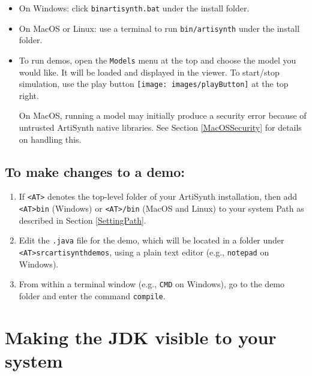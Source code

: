 \documentclass{article}
\begin{document}
\begin{itemize}[leftmargin=26pt]
 
\item On Windows: click {\tt bin\BKS artisynth.bat} under the install folder. 
 
\item On MacOS or Linux: use a terminal to run {\tt bin/artisynth} 
under the install folder.

\item[\ ] To run demos, open the {\tt Models} menu at the top and
choose the model you would like. It will be loaded and displayed in
the viewer. To start/stop simulation, use the play button
\texttt{[image: images/playButton]} at the top right.

\begin{sideblock}
On MacOS, running a model may initially produce a security error because of
untrusted ArtiSynth native libraries.  See Section \ref{MacOSSecurity} for
details on handling this.
\end{sideblock}

\end{itemize}

\subsection{To make changes to a demo:}

\begin{enumerate}

\item If {\tt <AT>} denotes the top-level folder of your ArtiSynth
installation, then add {\tt <AT>\BKS bin} (Windows) or {\tt <AT>/bin} (MacOS
and Linux) to your system Path as described in Section \ref{SettingPath}.

\item Edit the {\tt .java} file for the demo, which will be located
in a folder under {\tt <AT>\BKS src\BKS artisynth\BKS demos},
using a plain text editor (e.g., {\tt notepad} on Windows).

\item From within a terminal window (e.g., {\tt CMD} on Windows), go to the
demo folder and enter the command {\tt compile}.

\end{enumerate}

\section{Making the JDK visible to your system}
\label{MakingJDKVisible}
\end{document}
